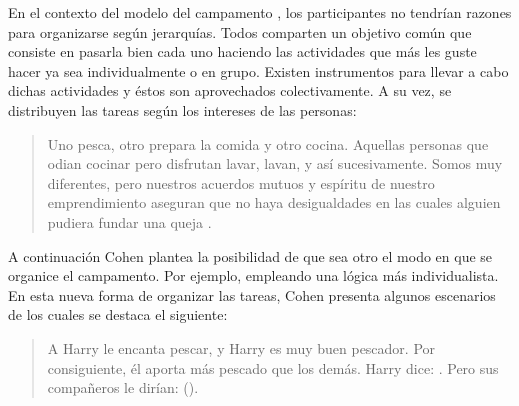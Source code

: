 En el contexto del modelo del campamento \citep{Cohen_2014c}, los participantes no tendrían razones para organizarse según jerarquías. Todos comparten un objetivo común que consiste en pasarla bien cada uno haciendo las actividades que más les guste hacer ya sea individualmente o en grupo. Existen instrumentos para llevar a cabo dichas actividades y éstos son aprovechados colectivamente. A su vez, se distribuyen las tareas según los intereses de las personas:

\vspace{3mm}
\begin{quote}
    Uno pesca, otro prepara la comida y otro cocina. Aquellas personas que odian cocinar pero disfrutan lavar, lavan, y así sucesivamente. Somos muy diferentes, pero nuestros acuerdos mutuos y espíritu de nuestro emprendimiento aseguran que no haya desigualdades en las cuales alguien pudiera fundar una queja \citep[p. 180]{Cohen_2014c}.
\end{quote}
\vspace{3mm}

A continuación Cohen plantea la posibilidad de que sea otro el modo en que se organice el campamento. Por ejemplo, empleando una lógica más individualista. En esta nueva forma de organizar las tareas, Cohen presenta algunos escenarios de los cuales se destaca el siguiente: 

\vspace{3mm}
\begin{quote}
    A Harry le encanta pescar, y Harry es muy buen pescador. Por consiguiente, él aporta más pescado que los demás. Harry dice: . Pero sus compañeros le dirían:  (\citeyear[p. 181-182]{Cohen_2014c}).
\end{quote}
\vspace{3mm}

